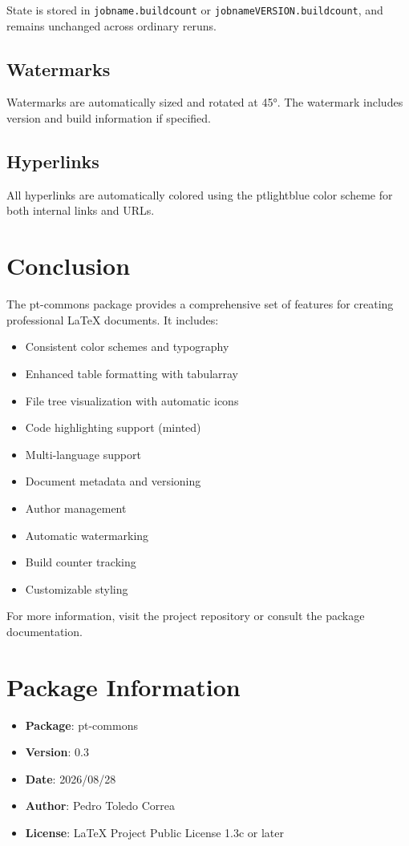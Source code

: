\documentclass[11pt,letterpaper]{article}
\begin{document}
State is stored in \texttt{jobname.buildcount} or
\texttt{jobnameVERSION.buildcount}, and remains unchanged across ordinary
reruns.

\subsection{Watermarks}

Watermarks are automatically sized and rotated at 45°. The watermark includes version and build information if specified.

\subsection{Hyperlinks}

All hyperlinks are automatically colored using the ptlightblue color scheme for both internal links and URLs.

\section{Conclusion}

The pt-commons package provides a comprehensive set of features for creating professional LaTeX documents. It includes:

\begin{itemize}
    \item Consistent color schemes and typography
    \item Enhanced table formatting with tabularray
    \item File tree visualization with automatic icons
    \item Code highlighting support (minted)
    \item Multi-language support
    \item Document metadata and versioning
    \item Author management
    \item Automatic watermarking
    \item Build counter tracking
    \item Customizable styling
\end{itemize}

For more information, visit the project repository or consult the package documentation.

\section*{Package Information}

\begin{itemize}
    \item \textbf{Package}: pt-commons
    \item \textbf{Version}: 0.3
    \item \textbf{Date}: 2026/08/28
    \item \textbf{Author}: Pedro Toledo Correa
    \item \textbf{License}: LaTeX Project Public License 1.3c or later
\end{itemize}
\end{document}
